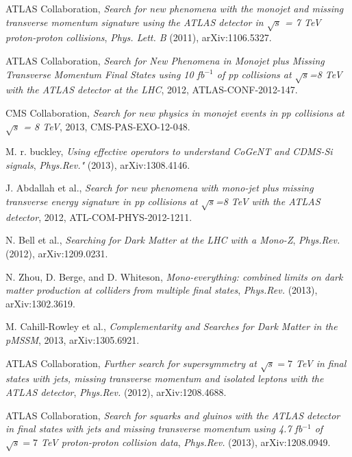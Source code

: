 %
%

ATLAS Collaboration, \emph{Search for new phenomena with the monojet and missing transverse momentum signature using the ATLAS detector in $\sqrt{s}$ = 7 TeV proton-proton collisions}, \emph{Phys. Lett. B} (2011), arXiv:1106.5327.

ATLAS Collaboration, \emph{Search for New Phenomena in Monojet plus Missing Transverse Momentum Final States using 10 fb$^{-1}$ of pp collisions at $\sqrt{s}$=8 TeV with the ATLAS detector at the LHC}, 2012, ATLAS-CONF-2012-147.

CMS Collaboration, \emph{Search for new physics in monojet events in pp collisions at $\sqrt{s}$ = 8 TeV}, 2013, CMS-PAS-EXO-12-048.

M. r. buckley, \emph{Using effective operators to understand CoGeNT and CDMS-Si signals}, \emph{Phys.Rev."} (2013), arXiv:1308.4146.

J. Abdallah et al., \emph{Search for new phenomena with mono-jet plus missing transverse energy signature in pp collisions at $\sqrt{s}$=8 TeV with the ATLAS detector}, 2012, ATL-COM-PHYS-2012-1211.

N. Bell et al., \emph{Searching for Dark Matter at the LHC with a Mono-Z}, \emph{Phys.Rev.} (2012), arXiv:1209.0231.

N. Zhou, D. Berge, and D. Whiteson, \emph{Mono-everything: combined limits on dark matter production at colliders from multiple final states}, \emph{Phys.Rev.} (2013), arXiv:1302.3619.

M. Cahill-Rowley et al., \emph{Complementarity and Searches for Dark Matter in the pMSSM}, 2013, arXiv:1305.6921.

ATLAS Collaboration, \emph{Further search for supersymmetry at $\sqrt{s}=7$ TeV in final states with jets, missing transverse momentum and isolated leptons with the ATLAS detector}, \emph{Phys.Rev.} (2012), arXiv:1208.4688.

ATLAS Collaboration, \emph{Search for squarks and gluinos with the ATLAS detector in final states with jets and missing transverse momentum using 4.7 fb$^{-1}$ of $\sqrt{s}=7$ TeV proton-proton collision data}, \emph{Phys.Rev.} (2013), arXiv:1208.0949.

